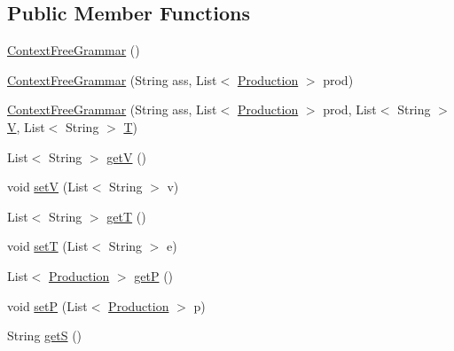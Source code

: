 \subsection*{Public Member Functions}
\begin{DoxyCompactItemize}
\item 
\hyperlink{classcontext_free_1_1grammar_1_1_context_free_grammar_ab78c5e13de642ff84db424e6fb4a5aa1}{Context\-Free\-Grammar} ()
\item 
\hyperlink{classcontext_free_1_1grammar_1_1_context_free_grammar_ad4871f790005d3582e0f4d50aceac810}{Context\-Free\-Grammar} (String ass, List$<$ \hyperlink{classcontext_free_1_1grammar_1_1_production}{Production} $>$ prod)
\item 
\hyperlink{classcontext_free_1_1grammar_1_1_context_free_grammar_aa29c85cc857ff390f50efc82d7c959e9}{Context\-Free\-Grammar} (String ass, List$<$ \hyperlink{classcontext_free_1_1grammar_1_1_production}{Production} $>$ prod, List$<$ String $>$ \hyperlink{classcontext_free_1_1grammar_1_1_context_free_grammar_a8cecf8ee3fe6ca01f58aacf390720746}{V}, List$<$ String $>$ \hyperlink{classcontext_free_1_1grammar_1_1_context_free_grammar_a5e6072d2c2f11703160c3c39c2968489}{T})
\item 
List$<$ String $>$ \hyperlink{classcontext_free_1_1grammar_1_1_context_free_grammar_a664b69a446100c7c4e7a390fb2ee5ebc}{get\-V} ()
\item 
void \hyperlink{classcontext_free_1_1grammar_1_1_context_free_grammar_ad3d3e1efadeb4cc6ed252342fd52c76c}{set\-V} (List$<$ String $>$ v)
\item 
List$<$ String $>$ \hyperlink{classcontext_free_1_1grammar_1_1_context_free_grammar_a75f1bbf1e0d1d1350032c628779fcffd}{get\-T} ()
\item 
void \hyperlink{classcontext_free_1_1grammar_1_1_context_free_grammar_aa1c9a277d660b2ba8443f47cb9543811}{set\-T} (List$<$ String $>$ e)
\item 
List$<$ \hyperlink{classcontext_free_1_1grammar_1_1_production}{Production} $>$ \hyperlink{classcontext_free_1_1grammar_1_1_context_free_grammar_ad00a00b018844cf2acb0c1c5f5d97468}{get\-P} ()
\item 
void \hyperlink{classcontext_free_1_1grammar_1_1_context_free_grammar_a2a66695521702040224c23898b579c92}{set\-P} (List$<$ \hyperlink{classcontext_free_1_1grammar_1_1_production}{Production} $>$ p)
\item 
String \hyperlink{classcontext_free_1_1grammar_1_1_context_free_grammar_ad278c4f5e2bdec1d011d11a3008d8754}{get\-S} ()
\item 

\end{DoxyCompactItemize}
